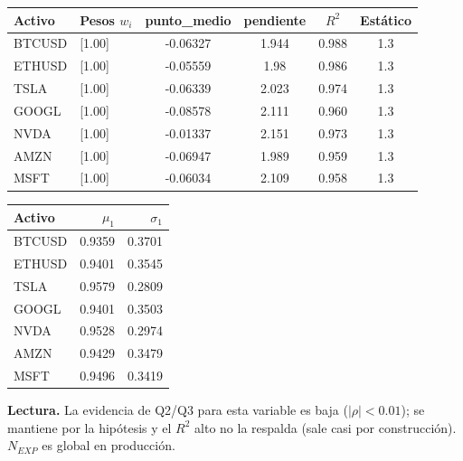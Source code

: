 \documentclass[11pt,a4paper]{article}
\begin{document}
\begin{center}\end{center}
\begin{center}\small\setlength{\tabcolsep}{5pt}
\begin{tabular}{llcccc}\toprule
Activo & Pesos $w_i$ & punto\_medio & pendiente & $R^2$ & Estático \\\midrule
BTCUSD & [1.00] & -0.06327 & 1.944 & 0.988 & 1.3 \\
ETHUSD & [1.00] & -0.05559 & 1.98 & 0.986 & 1.3 \\
TSLA & [1.00] & -0.06339 & 2.023 & 0.974 & 1.3 \\
GOOGL & [1.00] & -0.08578 & 2.111 & 0.960 & 1.3 \\
NVDA & [1.00] & -0.01337 & 2.151 & 0.973 & 1.3 \\
AMZN & [1.00] & -0.06947 & 1.989 & 0.959 & 1.3 \\
MSFT & [1.00] & -0.06034 & 2.109 & 0.958 & 1.3 \\
\bottomrule\end{tabular}

\medskip
\begin{tabular}{lrr}\toprule
Activo & $\mu_1$ & $\sigma_1$ \\\midrule
BTCUSD & 0.9359 & 0.3701 \\
ETHUSD & 0.9401 & 0.3545 \\
TSLA & 0.9579 & 0.2809 \\
GOOGL & 0.9401 & 0.3503 \\
NVDA & 0.9528 & 0.2974 \\
AMZN & 0.9429 & 0.3479 \\
MSFT & 0.9496 & 0.3419 \\
\bottomrule\end{tabular}\end{center}
\textbf{Lectura.} La evidencia de Q2/Q3 para esta variable es baja ($|\rho|<0.01$); se mantiene por la hipótesis y el $R^2$ alto no la respalda (sale casi por construcción). $N_{EXP}$ es global en producción.
\newpage
\end{document}
